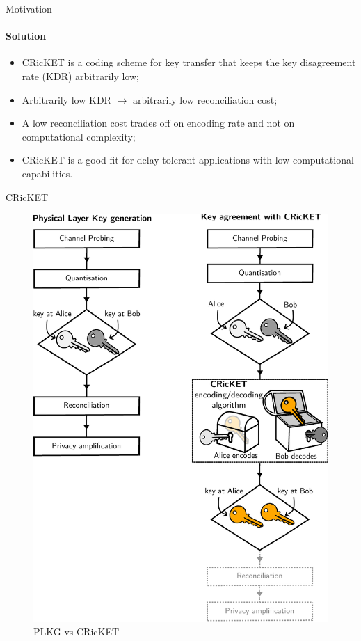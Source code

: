 \begin{frame}{Motivation}
\framesubtitle{Solution}
\begin{itemize} 
    \item CRicKET is a coding scheme for key transfer that keeps the key disagreement rate (KDR) arbitrarily low;
    \item Arbitrarily low KDR $\rightarrow$ arbitrarily low reconciliation cost;
    
    \item A low reconciliation cost trades off on encoding rate and not on computational complexity;
    \item CRicKET is a good fit for delay-tolerant applications with low computational capabilities. 
\end{itemize}
\end{frame}

\begin{frame}{CRicKET}
\begin{figure}
    \centering
    \vspace{-1.25cm}
    \includegraphics[scale = 0.4]{figures/Cricket/cricket vs PLKGv2.pdf}
    \caption{PLKG vs CRicKET}
    \label{fig:enter-label}
\end{figure}    
\end{frame}

